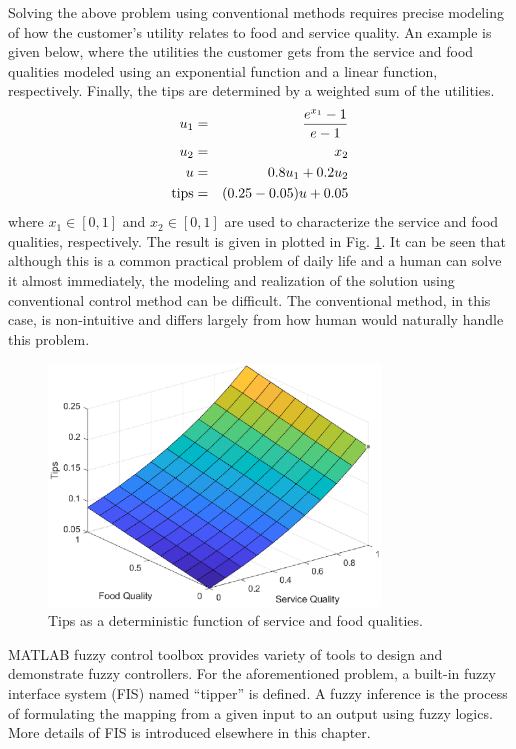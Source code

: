 Solving the above problem using conventional methods requires precise modeling of how the customer's utility relates to food and service quality. An example is given below, where the utilities the customer gets from the service and food qualities modeled using an exponential function and a linear function, respectively. Finally, the tips are determined by a weighted sum of the utilities.
\begin{eqnarray}
	u_1 &=& \dfrac{e^{x_1}-1}{e-1} \nonumber \\
	u_2 &=& x_2 \nonumber \\
	u &=& 0.8 u_1 + 0.2 u_2 \nonumber \\
	\textup{tips} &=& (0.25-0.05)u + 0.05 \nonumber
\end{eqnarray}
where $x_1\in [0,1]$ and $x_2 \in [0,1]$ are used to characterize the service and food qualities, respectively. The result is given in plotted in Fig. \ref{ch:fcs:fig:motivatingexp_conventional}. It can be seen that although this is a common practical problem of daily life and a human can solve it almost immediately, the modeling and realization of the solution using conventional control method can be difficult. The conventional method, in this case, is non-intuitive and differs largely from how human would naturally handle this problem.

\begin{figure}
	\centering
	\includegraphics[width=250pt]{chapters/ch-fuzzy-control-system/figures/motivatingexp_conventional.eps}
	\caption{Tips as a deterministic function of service and food qualities.} \label{ch:fcs:fig:motivatingexp_conventional}
\end{figure}

MATLAB fuzzy control toolbox provides variety of tools to design and demonstrate fuzzy controllers. For the aforementioned problem, a built-in fuzzy interface system (FIS) named ``tipper'' is defined. A fuzzy inference is the process of formulating the mapping from a given input to an output using fuzzy logics. More details of FIS is introduced elsewhere in this chapter.

